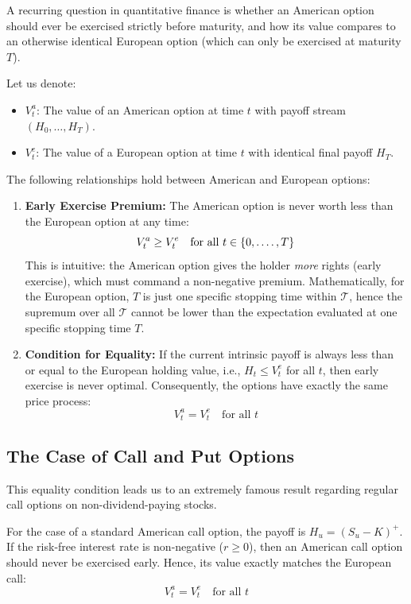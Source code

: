 A recurring question in quantitative finance is whether an American option should ever be exercised strictly before maturity, and how its value compares to an otherwise identical European option (which can only be exercised at maturity $T$).

Let us denote:
\begin{itemize}
    \item $V^a_t$: The value of an American option at time $t$ with payoff stream $(H_0, \ldots, H_T)$.
    \item $V^e_t$: The value of a European option at time $t$ with identical final payoff $H_T$.
\end{itemize}

\begin{proposition}
The following relationships hold between American and European options:
\begin{enumerate}[label=(\alph*)]
    \item \textbf{Early Exercise Premium:} The American option is never worth less than the European option at any time: 
    $$ V^a_t \geq V^e_t \quad \text{for all } t \in \{0, \ldotp \ldots, T\} $$
    This is intuitive: the American option gives the holder \textit{more} rights (early exercise), which must command a non-negative premium. Mathematically, for the European option, $T$ is just one specific stopping time within $\mathcal{T}$, hence the supremum over all $\mathcal{T}$ cannot be lower than the expectation evaluated at one specific stopping time $T$.
    \item \textbf{Condition for Equality:} If the current intrinsic payoff is always less than or equal to the European holding value, i.e., $H_t \leq V^e_t$ for all $t$, then early exercise is never optimal. Consequently, the options have exactly the same price process:
    $$ V^a_t = V^e_t \quad \text{for all } t $$
\end{enumerate}
\end{proposition}

\subsection{The Case of Call and Put Options}

This equality condition leads us to an extremely famous result regarding regular call options on non-dividend-paying stocks.

\begin{corollary}
For the case of a standard American call option, the payoff is $H_u = (S_u - K)^+$. If the risk-free interest rate is non-negative ($r \geq 0$), then an American call option should never be exercised early. Hence, its value exactly matches the European call:
$$ V^a_t = V^e_t \quad \text{for all } t $$
\end{corollary}

